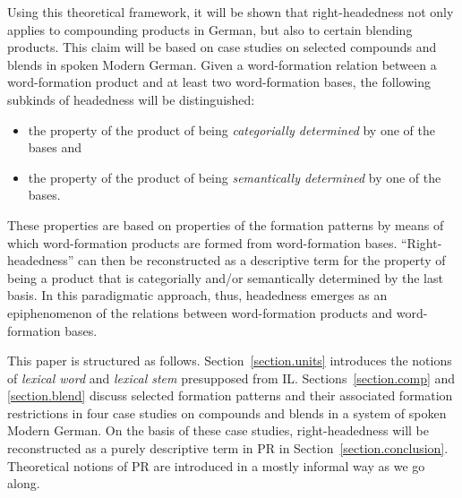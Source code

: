 \documentclass[output=paper
  ,nobabel
  ,draftmode
  ,colorlinks, citecolor=brown
]{langscibook}
\begin{document}
Using this theoretical framework, it will be shown that right-headedness not
only applies to compounding products in German, but also to certain blending
products. This claim will be based on case studies on selected compounds and
blends in spoken Modern German. Given a word-formation relation between a
word-formation product and at least two word-formation bases, the following
subkinds of headedness will be distinguished: \begin{itemize}
\item{} the property of the product of being \emph{categorially determined}
by one of the bases and
\item{} the property of the product of being \emph{semantically determined}
by one of the bases.
\end{itemize} These properties are based on properties of the formation patterns by
means of which word-formation products are formed from word-formation bases.
``Right-headedness'' can then be reconstructed as a descriptive
term for the property of being a product that is categorially and/or
semantically determined by the last basis. In this paradigmatic approach, thus,
headedness emerges as an epiphenomenon of the relations between word-formation
products and word-formation bases.

This paper is structured as follows. Section \ref{section.units} introduces the notions of \emph{lexical
word} and \emph{lexical stem} presupposed from IL. Sections \ref{section.comp} and \ref{section.blend} discuss selected formation patterns and their
associated formation restrictions in four case studies on compounds and blends
in a system of spoken Modern German. On the basis of these case studies,
right-headedness will be reconstructed as a purely descriptive term in PR in
Section \ref{section.conclusion}. Theoretical notions
of PR are introduced in a mostly informal way as we go along.
\end{document}

